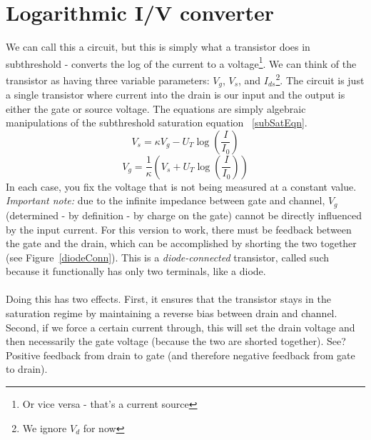 \documentclass[main]{subfiles}
\begin{document}

\section{Logarithmic I/V converter}
We can call this a circuit, but this is simply what a transistor does in subthreshold - converts the log of the current to a voltage\footnote{Or vice versa - that's a current source}. We can think of the transistor as having three variable parameters: $V_g$, $V_s$, and $I_{ds}$\footnote{We ignore $V_d$ for now}. The circuit is just a single transistor where current into the drain is our input and the output is either the gate or source voltage. The equations are simply algebraic manipulations of the subthreshold saturation equation ~\eqref{subSatEqn}.
\begin{equation}
V_s = \kappa V_g - U_T \log \left(\frac{I}{I_0}\right)
\end{equation}
\begin{equation}
V_g = \frac{1}{\kappa}\left( V_s + U_T \log \left(\frac{I}{I_0}\right) \right)
\end{equation}
In each case, you fix the voltage that is not being measured at a constant value. \emph{Important note:} due to the infinite impedance between gate and channel, $V_g$ (determined  - by definition - by charge on the gate) cannot be directly influenced by the input current. For this version to work, there must be feedback between the gate and the drain, which can be accomplished by shorting the two together (see Figure~\ref{diodeConn}). This is a \emph{diode-connected} transistor, called such because it functionally has only two terminals, like a diode.\\ \\
Doing this has two effects. First, it ensures that the transistor stays in the saturation regime by maintaining a reverse bias between drain and channel. Second, if we force a certain current through, this will set the drain voltage and then necessarily the gate voltage (because the two are shorted together). See? Positive feedback from drain to gate (and therefore negative feedback from gate to drain).
\end{document}
